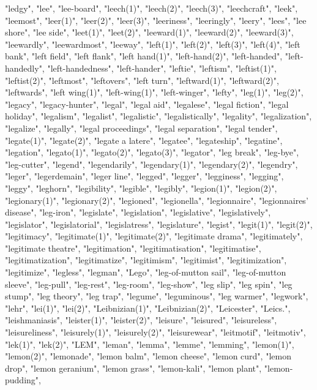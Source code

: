 "ledgy",
"lee",
"lee-board",
"leech(1)",
"leech(2)",
"leech(3)",
"leechcraft",
"leek",
"leemost",
"leer(1)",
"leer(2)",
"leer(3)",
"leeriness",
"leeringly",
"leery",
"lees",
"lee shore",
"lee side",
"leet(1)",
"leet(2)",
"leeward(1)",
"leeward(2)",
"leeward(3)",
"leewardly",
"leewardmost",
"leeway",
"left(1)",
"left(2)",
"left(3)",
"left(4)",
"left bank",
"left field",
"left flank",
"left hand(1)",
"left-hand(2)",
"left-handed",
"left-handedly",
"left-handedness",
"left-hander",
"leftie",
"leftism",
"leftist(1)",
"leftist(2)",
"leftmost",
"leftovers",
"left turn",
"leftward(1)",
"leftward(2)",
"leftwards",
"left wing(1)",
"left-wing(1)",
"left-winger",
"lefty",
"leg(1)",
"leg(2)",
"legacy",
"legacy-hunter",
"legal",
"legal aid",
"legalese",
"legal fiction",
"legal holiday",
"legalism",
"legalist",
"legalistic",
"legalistically",
"legality",
"legalization",
"legalize",
"legally",
"legal proceedings",
"legal separation",
"legal tender",
"legate(1)",
"legate(2)",
"legate a latere",
"legatee",
"legateship",
"legatine",
"legation",
"legato(1)",
"legato(2)",
"legato(3)",
"legator",
"leg break",
"leg-bye",
"leg-cutter",
"legend",
"legendarily",
"legendary(1)",
"legendary(2)",
"legendry",
"leger",
"legerdemain",
"leger line",
"legged",
"legger",
"legginess",
"legging",
"leggy",
"leghorn",
"legibility",
"legible",
"legibly",
"legion(1)",
"legion(2)",
"legionary(1)",
"legionary(2)",
"legioned",
"legionella",
"legionnaire",
"legionnaires' disease",
"leg-iron",
"legislate",
"legislation",
"legislative",
"legislatively",
"legislator",
"legislatorial",
"legislatress",
"legislature",
"legist",
"legit(1)",
"legit(2)",
"legitimacy",
"legitimate(1)",
"legitimate(2)",
"legitimate drama",
"legitimately",
"legitimate theatre",
"legitimation",
"legitimatisation",
"legitimatise",
"legitimatization",
"legitimatize",
"legitimism",
"legitimist",
"legitimization",
"legitimize",
"legless",
"legman",
"Lego",
"leg-of-mutton sail",
"leg-of-mutton sleeve",
"leg-pull",
"leg-rest",
"leg-room",
"leg-show",
"leg slip",
"leg spin",
"leg stump",
"leg theory",
"leg trap",
"legume",
"leguminous",
"leg warmer",
"legwork",
"lehr",
"lei(1)",
"lei(2)",
"Leibnizian(1)",
"Leibnizian(2)",
"Leicester",
"Leics.",
"leishmaniasis",
"leister(1)",
"leister(2)",
"leisure",
"leisured",
"leisureless",
"leisureliness",
"leisurely(1)",
"leisurely(2)",
"leisurewear",
"leitmotif",
"leitmotiv",
"lek(1)",
"lek(2)",
"LEM",
"leman",
"lemma",
"lemme",
"lemming",
"lemon(1)",
"lemon(2)",
"lemonade",
"lemon balm",
"lemon cheese",
"lemon curd",
"lemon drop",
"lemon geranium",
"lemon grass",
"lemon-kali",
"lemon plant",
"lemon-pudding",
